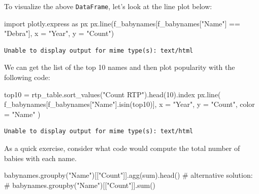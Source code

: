 \documentclass[
  letterpaper,
  DIV=11,
  numbers=noendperiod]{scrreprt}
\newenvironment{Shaded}{\begin{snugshade}}{\end{snugshade}}
\newcommand{\BuiltInTok}[1]{\textcolor[rgb]{0.00,0.23,0.31}{#1}}
\newcommand{\CommentTok}[1]{\textcolor[rgb]{0.37,0.37,0.37}{#1}}
\newcommand{\DecValTok}[1]{\textcolor[rgb]{0.68,0.00,0.00}{#1}}
\newcommand{\ImportTok}[1]{\textcolor[rgb]{0.00,0.46,0.62}{#1}}
\newcommand{\NormalTok}[1]{\textcolor[rgb]{0.00,0.23,0.31}{#1}}
\newcommand{\OperatorTok}[1]{\textcolor[rgb]{0.37,0.37,0.37}{#1}}
\newcommand{\StringTok}[1]{\textcolor[rgb]{0.13,0.47,0.30}{#1}}
\begin{document}
To visualize the above \texttt{DataFrame}, let's look at the line plot
below:

\begin{Shaded}
\begin{Highlighting}[]
\ImportTok{import}\NormalTok{ plotly.express }\ImportTok{as}\NormalTok{ px}
\NormalTok{px.line(f\_babynames[f\_babynames[}\StringTok{"Name"}\NormalTok{] }\OperatorTok{==} \StringTok{"Debra"}\NormalTok{], x }\OperatorTok{=} \StringTok{"Year"}\NormalTok{, y }\OperatorTok{=} \StringTok{"Count"}\NormalTok{)}
\end{Highlighting}
\end{Shaded}

\begin{verbatim}
Unable to display output for mime type(s): text/html
\end{verbatim}

We can get the list of the top 10 names and then plot popularity with
the following code:

\begin{Shaded}
\begin{Highlighting}[]
\NormalTok{top10 }\OperatorTok{=}\NormalTok{ rtp\_table.sort\_values(}\StringTok{"Count RTP"}\NormalTok{).head(}\DecValTok{10}\NormalTok{).index}
\NormalTok{px.line(}
\NormalTok{    f\_babynames[f\_babynames[}\StringTok{"Name"}\NormalTok{].isin(top10)], }
\NormalTok{    x }\OperatorTok{=} \StringTok{"Year"}\NormalTok{, }
\NormalTok{    y }\OperatorTok{=} \StringTok{"Count"}\NormalTok{, }
\NormalTok{    color }\OperatorTok{=} \StringTok{"Name"}
\NormalTok{)}
\end{Highlighting}
\end{Shaded}

\begin{verbatim}
Unable to display output for mime type(s): text/html
\end{verbatim}

As a quick exercise, consider what code would compute the total number
of babies with each name.

\begin{Shaded}
\begin{Highlighting}[]
\NormalTok{babynames.groupby(}\StringTok{"Name"}\NormalTok{)[[}\StringTok{"Count"}\NormalTok{]].agg(}\BuiltInTok{sum}\NormalTok{).head()}
\CommentTok{\# alternative solution: }
\CommentTok{\# babynames.groupby("Name")[["Count"]].sum()}
\end{Highlighting}
\end{Shaded}
\end{document}
